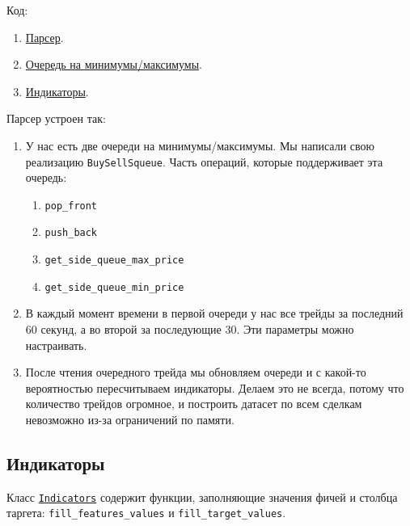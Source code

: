 Код:
\begin{enumerate}
\item \href{https://github.com/dexety/dex-trading-system/blob/main/research/lp-0004-trades-volume/parse/parse_trades_data.py}{Парсер}. 
\item \href{https://github.com/dexety/dex-trading-system/blob/main/utils/buy_sell_queue.py}{Очередь на минимумы/максимумы}.
\item \href{https://github.com/dexety/dex-trading-system/blob/main/utils/indicators.py}{Индикаторы}.
\end{enumerate}


Парсер устроен так:

\begin{enumerate}

\item У нас есть две очереди на минимумы/максимумы. Мы написали свою реализацию \texttt{BuySellSqueue}. Часть операций, которые поддерживает эта очередь:
\begin{enumerate}
    \item \texttt{pop\_front}
    \item \texttt{push\_back}
    \item \texttt{get\_side\_queue\_max\_price}
    \item \texttt{get\_side\_queue\_min\_price}
\end{enumerate}

\item В каждый момент времени в первой очереди у нас все трейды за последний 60 секунд, а во второй за последующие 30. Эти параметры можно настраивать. 
\item После чтения очередного трейда мы обновляем очереди и с какой-то вероятностью пересчитываем индикаторы. Делаем это не всегда, потому что количество трейдов огромное, и построить датасет по всем сделкам невозможно из-за ограничений по памяти.
    
\end{enumerate}

\subsection{Индикаторы}

Класс \href{https://github.com/dexety/dex-trading-system/blob/ca0370d602f2dfa05262b9b8574002f965ac1502/utils/indicators.py#L5}{\texttt{Indicators}} содержит функции, заполняющие значения фичей и столбца таргета: \texttt{fill\_features\_values} и \texttt{fill\_target\_values}.

